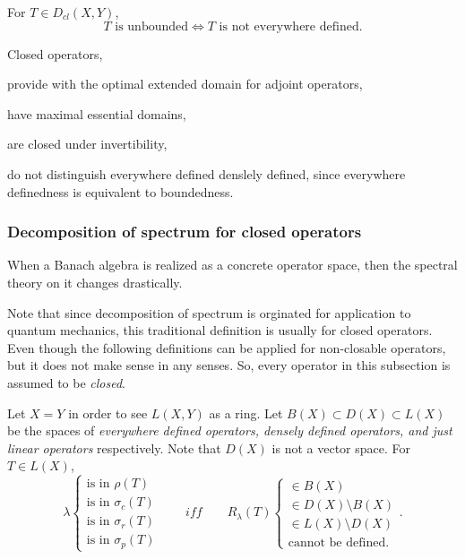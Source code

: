 \documentclass{../crs}
\begin{document}
\begin{prop}
For $T\in D_{cl}(X,Y)$,
\[T\text{ is unbounded}\iff T\text{ is not everywhere defined}.\]
\end{prop}

Closed operators,
\begin{cond}
\item provide with the optimal extended domain for adjoint operators,
\item have maximal essential domains,
\item are closed under invertibility,
\item do not distinguish everywhere defined denslely defined, since everywhere definedness is equivalent to boundedness.
\end{cond}


\subsubsection{Decomposition of spectrum for closed operators}

When a Banach algebra is realized as a concrete operator space, then the spectral theory on it changes drastically.

Note that since decomposition of spectrum is orginated for application to quantum mechanics, this traditional definition is usually for closed operators.
Even though the following definitions can be applied for non-closable operators, but it does not make sense in any senses.
So, every operator in this subsection is assumed to be \emph{closed}.

Let $X=Y$ in order to see $L(X,Y)$ as a ring.
Let $B(X)\subset D(X)\subset L(X)$ be the spaces of \emph{everywhere defined operators, densely defined operators, and just linear operators} respectively.
Note that $D(X)$ is not a vector space.
For $T\in L(X)$,
\[\lambda\begin{cases}\text{is in }\rho(T)\\\text{is in }\sigma_c(T)\\\text{is in }\sigma_r(T)\\\text{is in }\sigma_p(T)\end{cases}\qquad\textit{iff}\qquad R_\lambda(T)\begin{cases}\in B(X)\\\in D(X)\setminus B(X)\\\in L(X)\setminus D(X)\\\text{cannot be defined.}\end{cases}.\]
\end{document}
